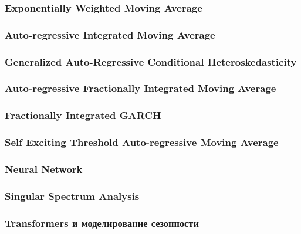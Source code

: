 		\subsubsection{Exponentially Weighted Moving Average}
		\subsubsection{Auto-regressive Integrated Moving Average}
		\subsubsection{Generalized Auto-Regressive Conditional Heteroskedasticity}
		\subsubsection{Auto-regressive Fractionally Integrated Moving Average}
		\subsubsection{Fractionally Integrated GARCH}
		\subsubsection{Self Exciting Threshold Auto-regressive Moving Average}
		\subsubsection{Neural Network}
		\subsubsection{Singular Spectrum Analysis}
		\subsubsection{Transformers и моделирование сезонности}
